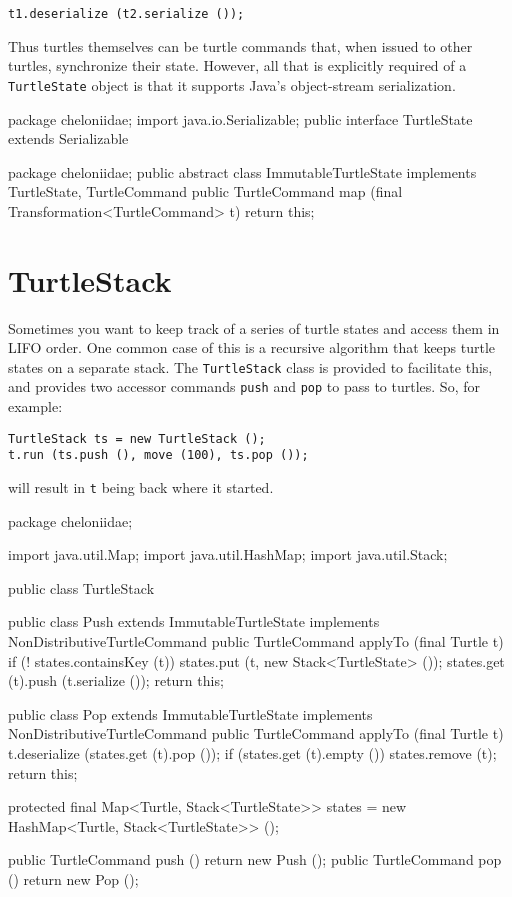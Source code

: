\documentclass{report}
\begin{document}
\begin{verbatim}
t1.deserialize (t2.serialize ());
\end{verbatim}

      \noindent Thus turtles themselves can be turtle commands that, when issued to other turtles, synchronize their state. However, all that is explicitly
      required of a {\tt TurtleState} object is that it supports Java's object-stream serialization.

\begin{javacode}
package cheloniidae;
import java.io.Serializable;
public interface TurtleState extends Serializable {}
\end{javacode}

\begin{javacode}
package cheloniidae;
public abstract class ImmutableTurtleState implements TurtleState, TurtleCommand {
  public TurtleCommand map (final Transformation<TurtleCommand> t) {return this;}
}
\end{javacode}

\section {TurtleStack} \label{sec:turtlestack}
      Sometimes you want to keep track of a series of turtle states and access them in LIFO order. One common case of this is a recursive algorithm that keeps
      turtle states on a separate stack. The {\tt TurtleStack} class is provided to facilitate this, and provides two accessor commands {\tt push} and {\tt pop}
      to pass to turtles. So, for example:

\begin{verbatim}
TurtleStack ts = new TurtleStack ();
t.run (ts.push (), move (100), ts.pop ());
\end{verbatim}

      \noindent will result in {\tt t} being back where it started.

\begin{javacode}
package cheloniidae;

import java.util.Map;
import java.util.HashMap;
import java.util.Stack;

public class TurtleStack {
  public class Push extends ImmutableTurtleState implements NonDistributiveTurtleCommand {
    public TurtleCommand applyTo (final Turtle t) {
      if (! states.containsKey (t)) states.put (t, new Stack<TurtleState> ());
      states.get (t).push (t.serialize ());
      return this;
    }
  }

  public class Pop extends ImmutableTurtleState implements NonDistributiveTurtleCommand {
    public TurtleCommand applyTo (final Turtle t) {
      t.deserialize (states.get (t).pop ());
      if (states.get (t).empty ()) states.remove (t);
      return this;
    }
  }

  protected final Map<Turtle, Stack<TurtleState>> states = new HashMap<Turtle, Stack<TurtleState>> ();

  public TurtleCommand push () {return new Push ();}
  public TurtleCommand pop  () {return new Pop ();}
}
\end{javacode}
\end{document}
